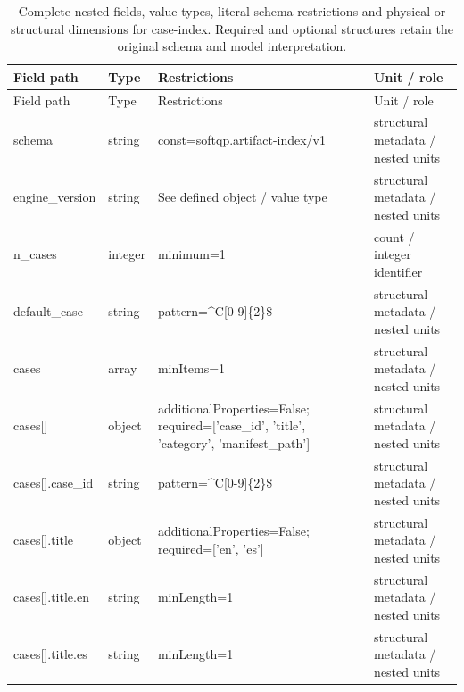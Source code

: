 \begingroup\footnotesize\setlength{\tabcolsep}{3pt}
\begin{longtable}{@{}>{\raggedright\arraybackslash}p{}>{\raggedright\arraybackslash}p{}>{\raggedright\arraybackslash}p{}>{\raggedright\arraybackslash}p{}@{}}
\caption{Complete nested fields, value types, literal schema restrictions and physical or structural dimensions for case-index. Required and optional structures retain the original schema and model interpretation.}\label{tab:nested-case-index}\\
\toprule Field path & Type & Restrictions & Unit / role\\\midrule\endfirsthead
\toprule Field path & Type & Restrictions & Unit / role\\\midrule\endhead
\bottomrule\endfoot
schema & string & const=\allowbreak{}softqp.\allowbreak{}artifact-\allowbreak{}index/\allowbreak{}v1 & structural metadata /\allowbreak{} nested units\\
engine\_\allowbreak{}version & string & See defined object /\allowbreak{} value type & structural metadata /\allowbreak{} nested units\\
n\_\allowbreak{}cases & integer & minimum=\allowbreak{}1 & count /\allowbreak{} integer identifier\\
default\_\allowbreak{}case & string & pattern=\allowbreak{}\textasciicircum{}C[0-9]\{2\}\$ & structural metadata /\allowbreak{} nested units\\
cases & array & minItems=\allowbreak{}1 & structural metadata /\allowbreak{} nested units\\
cases[] & object & additionalProperties=\allowbreak{}False; required=\allowbreak{}['case\_\allowbreak{}id', 'title', 'category', 'manifest\_\allowbreak{}path'] & structural metadata /\allowbreak{} nested units\\
cases[].\allowbreak{}case\_\allowbreak{}id & string & pattern=\allowbreak{}\textasciicircum{}C[0-9]\{2\}\$ & structural metadata /\allowbreak{} nested units\\
cases[].\allowbreak{}title & object & additionalProperties=\allowbreak{}False; required=\allowbreak{}['en', 'es'] & structural metadata /\allowbreak{} nested units\\
cases[].\allowbreak{}title.\allowbreak{}en & string & minLength=\allowbreak{}1 & structural metadata /\allowbreak{} nested units\\
cases[].\allowbreak{}title.\allowbreak{}es & string & minLength=\allowbreak{}1 & structural metadata /\allowbreak{} nested units\\

\end{longtable}
